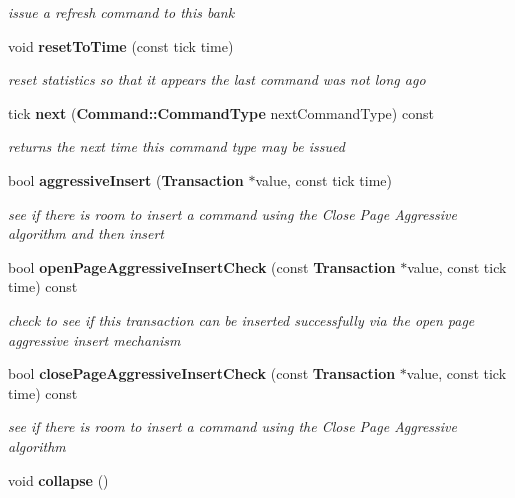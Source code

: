 \begin{CompactItemize}
\begin{CompactList}\small\item\em issue a refresh command to this bank \item\end{CompactList}\item 
void {\bf resetToTime} (const tick time)
\begin{CompactList}\small\item\em reset statistics so that it appears the last command was not long ago \item\end{CompactList}\item 
tick {\bf next} ({\bf Command::CommandType} nextCommandType) const \label{class_d_r_a_msim_i_i_1_1_bank_a896a275af07a53299ce3b5c2c33fea1}

\begin{CompactList}\small\item\em returns the next time this command type may be issued \item\end{CompactList}\item 
bool {\bf aggressiveInsert} ({\bf Transaction} $\ast$value, const tick time)
\begin{CompactList}\small\item\em see if there is room to insert a command using the Close Page Aggressive algorithm and then insert \item\end{CompactList}\item 
bool {\bf openPageAggressiveInsertCheck} (const {\bf Transaction} $\ast$value, const tick time) const 
\begin{CompactList}\small\item\em check to see if this transaction can be inserted successfully via the open page aggressive insert mechanism \item\end{CompactList}\item 
bool {\bf closePageAggressiveInsertCheck} (const {\bf Transaction} $\ast$value, const tick time) const 
\begin{CompactList}\small\item\em see if there is room to insert a command using the Close Page Aggressive algorithm \item\end{CompactList}\item 
void {\bf collapse} ()\label{class_d_r_a_msim_i_i_1_1_bank_c3aa018b8b63cbc809190eadee5990cd}


\end{CompactItemize}
